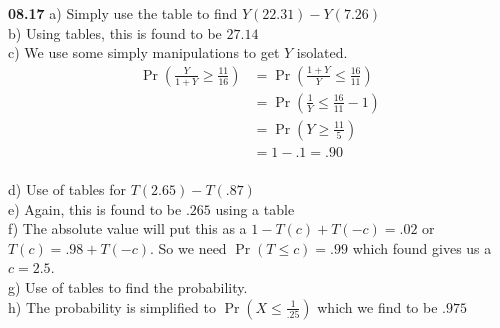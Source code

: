 

{\bf 08.17} a) Simply use the table to find $Y(22.31) - Y(7.26)$ \\

b) Using tables, this is found to be $27.14$ \\

c) We use some simply manipulations to get $Y$ isolated. \\
\begin{align*}
	\Pr \left( \frac{Y}{1+ Y} \geq \frac{11}{16} \right) & = \Pr \left( \frac{1 + Y}{Y} \leq \frac{16}{11} \right) \\
	& = \Pr \left( \frac{1}{Y} \leq \frac{16}{11} - 1 \right) \\
	& = \Pr \left( Y \geq \frac{11}{5} \right) \\
	& = 1 - .1 = .90 \\
\end{align*}

d) Use of tables for $T(2.65) - T(.87)$ \\

e) Again, this is found to be $.265$ using a table \\

f) The absolute value will put this as a $1 - T(c) + T(-c) = .02$ or $T(c) = .98 + T(-c)$. So we need $\Pr(T \leq c) = .99$
which found gives us a $c = 2.5$.  \\

g) Use of tables to find the probability. \\

h) The probability is simplified to $\Pr( X \leq \frac{1}{.25} )$ which we find to be $.975$ \\


